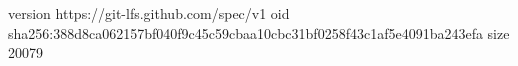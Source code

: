 version https://git-lfs.github.com/spec/v1
oid sha256:388d8ca062157bf040f9c45c59cbaa10cbc31bf0258f43c1af5e4091ba243efa
size 20079
